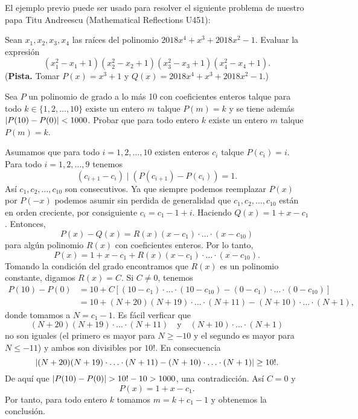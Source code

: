 \begin{note}
    El ejemplo previo puede ser usado para resolver el siguiente problema de nuestro papa Titu Andreescu (Mathematical Reflections U451):

    Sean $x_1, x_2, x_3, x_4$ las raíces del polinomio $2018 x^4 + x^3 + 2018x^2 - 1$.
    Evaluar la expresión
    \[
        (x_1^2 - x_1 + 1)(x_2^2 - x_2 + 1)(x_3^2 - x_3 + 1)(x_4^2 - x_4 + 1).
    \]
    (\textbf{Pista.} Tomar $P(x) = x^3 + 1$ y $Q(x) = 2018x^4 + x^3 + 2018x^2 - 1$.)
\end{note}

\begin{example}
    Sea $P$ un polinomio de grado a lo más 10 con coeficientes enteros talque para todo $k \in \{1, 2, \ldots, 10\}$ existe un entero $m$ talque $P(m) = k$ y se tiene además $\lvert P(10) - P(0)\rvert < 1000$.
    Probar que para todo entero $k$ existe un entero $m$ talque $P(m) = k$.
\end{example}
\begin{solution}
    Asumamos que para todo $i = 1, 2, \ldots, 10$ existen enteros $c_i$ talque $P(c_i) = i$.
    Para todo $i = 1, 2, \ldots, 9$ tenemos
    \[
        (c_{i + 1} - c_i) \mid \left( P(c_{i + 1}) - P(c_i)\right) = 1.
    \]
    Así $c_1, c_2, \ldots, c_{10}$ son consecutivos.
    Ya que siempre podemos reemplazar $P(x)$ por $P(-x)$ podemos asumir sin perdida de generalidad que $c_1, c_2, \ldots, c_{10}$ están en orden creciente, por consiguiente $c_i = c_1 - 1 + i$.
    Haciendo $Q(x) = 1 + x - c_1$.
    Entonces,
    \[
        P(x) - Q(x) = R(x) (x - c_1) \cdot \ldots \cdot (x - c_{10})
    \]
    para algún polinomio $R(x)$ con coeficientes enteros.
    Por lo tanto,
    \[
        P(x) = 1 + x - c_1 + R(x) (x - c_1) \cdot \ldots \cdot (x - c_{10}).
    \]
    Tomando la condición del grado encontramos que $R(x)$ es un polinomio constante, digamos $R(x) = C$.
    Si $C \neq 0$, tenemos
    \begin{align*}
        P(10) - P(0) &= 10 + C\left[ (10 - c_1) \cdot \ldots \cdot (10 - c_{10}) - (0 - c_1) \cdot \ldots \cdot (0 - c_{10}) \right]\\
        &= 10 + (N + 20)(N + 19) \cdot \ldots \cdot (N + 11) - (N + 10) \cdot \ldots \cdot (N + 1),
    \end{align*}
    donde tomamos a $N = c_1 - 1$.
    Es fácil verficar que
    \[
        (N + 20)(N + 19) \cdot \ldots \cdot (N + 11) \quad \text{y} \quad (N + 10) \cdot \ldots \cdot (N + 1)
    \]
    no son iguales (el primero es mayor para $N \geq -10$ y el segundo es mayor para $N \leq -11$) y ambos son divisibles por $10!$.
    En consecuencia
    \[
        \lvert(N + 20)(N + 19) \cdot \ldots \cdot (N + 11) - (N + 10) \cdot \ldots \cdot (N + 1)\rvert \geq 10!.
    \]
    De aquí que $\lvert P(10) - P(0)\rvert > 10! - 10 > 1000$, una contradicción.
    Así $C = 0$ y
    \[
        P(x) = 1 + x - c_1.
    \]
    Por tanto, para todo entero $k$ tomamos $m = k + c_1 - 1$ y obtenemos la conclusión.
\end{solution}

